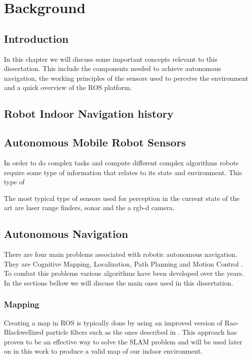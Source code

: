 \chapter{Background} \label{ch:Concepts}

\section{Introduction}
In this chapter we will discuss some important concepts relevant to this dissertation. This include the components needed to achieve autonomous navigation, the working principles of the sensors used to perceive the environment and a quick overview of the \ac{ROS} platform.
\section{Robot Indoor Navigation history}
\section{Autonomous Mobile Robot Sensors}

In order to do complex tasks and compute different complex algorithms robots require some type of information that relates to its state and environment. This type of 


The most typical type of sensors used for perception in the current state of the art are laser range finders, sonar and the a rgb-d camera.

\section {Autonomous Navigation}
There are four main problems associated with robotic autonomous navigation. They are Cognitive Mapping, Localization, Path Planning and Motion Control \cite{baranov2014}. To combat this problems various algorithms have been developed over the years. In the sections bellow we will discuss the main ones used in this dissertation.

\subsection{Mapping}

Creating a map in ROS is typically done by using an improved version of  Rao-Blackwellized particle filters such as the ones described in \cite{grisetti2007improved}. This approach has proven to be an effective way to solve the \ac{SLAM} problem and will be used later on in this work to produce a valid map of our indoor environment.
